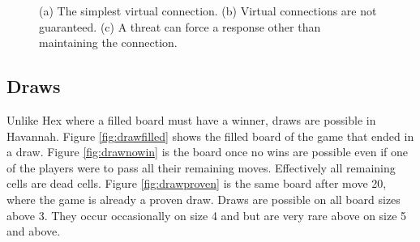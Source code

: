 \begin{figure}
  \centering


	\caption{(a) The simplest virtual connection. (b) Virtual connections are not guaranteed. (c) A threat can force a response other than maintaining the connection.}
	\label{fig:ringvc}
\end{figure}



\subsection{Draws}

Unlike Hex where a filled board must have a winner, draws are possible in Havannah. Figure \ref{fig:drawfilled} shows the filled board of the game that ended in a draw. Figure \ref{fig:drawnowin} is the board once no wins are possible even if one of the players were to pass all their remaining moves. Effectively all remaining cells are dead cells. Figure \ref{fig:drawproven} is the same board after move 20, where the game is already a proven draw. Draws are possible on all board sizes above 3. They occur occasionally on size 4 and but are very rare above on size 5 and above.

